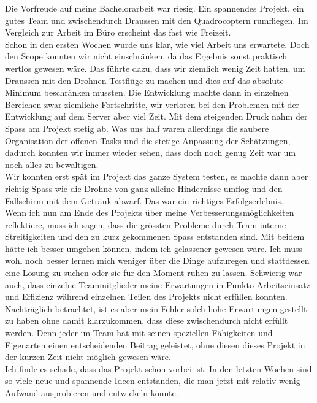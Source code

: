 Die Vorfreude auf meine Bachelorarbeit war riesig. Ein spannendes Projekt, ein gutes Team und zwischendurch Draussen mit den Quadrocoptern rumfliegen. Im Vergleich zur Arbeit im Büro erscheint das fast wie Freizeit.\\

Schon in den ersten Wochen wurde uns klar, wie viel Arbeit uns erwartete. Doch den Scope konnten wir nicht einschränken, da das Ergebnis sonst praktisch wertlos gewesen wäre. Das führte dazu, dass wir ziemlich wenig Zeit hatten, um Draussen mit den Drohnen Testflüge zu machen und dies auf das absolute Minimum beschränken mussten. Die Entwicklung machte dann in einzelnen Bereichen zwar ziemliche Fortschritte, wir verloren bei den Problemen mit der Entwicklung auf dem Server aber viel Zeit. Mit dem steigenden Druck nahm der Spass am Projekt stetig ab. Was uns half waren allerdings die saubere Organisation der offenen Tasks und die stetige Anpassung der Schätzungen, dadurch konnten wir immer wieder sehen, dass doch noch genug Zeit war um noch alles zu bewältigen.\\

Wir konnten erst spät im Projekt das ganze System testen, es machte dann aber richtig Spass wie die Drohne von ganz alleine Hindernisse umflog und den Fallschirm mit dem Getränk abwarf. Das war ein richtiges Erfolgserlebnis.\\

Wenn ich nun am Ende des Projekts über meine Verbesserungsmöglichkeiten reflektiere, muss ich sagen, dass die grössten Probleme durch Team-interne Streitigkeiten und den zu kurz gekommenen Spass entstanden sind. Mit beidem hätte ich besser umgehen können, indem ich gelassener gewesen wäre. Ich muss wohl noch besser lernen mich weniger über die Dinge aufzuregen und stattdessen eine Lösung zu suchen oder sie für den Moment ruhen zu lassen. Schwierig war auch, dass einzelne Teammitglieder meine Erwartungen in Punkto Arbeitseinsatz und Effizienz während einzelnen Teilen des Projekts nicht erfüllen konnten. Nachträglich betrachtet, ist es aber mein Fehler solch hohe Erwartungen gestellt zu haben ohne damit klarzukommen, dass diese zwischendurch nicht erfüllt werden. Denn jeder im Team hat mit seinen speziellen Fähigkeiten und Eigenarten einen entscheidenden Beitrag geleistet, ohne diesen dieses Projekt in der kurzen Zeit nicht möglich gewesen wäre. \\

Ich finde es schade, dass das Projekt schon vorbei ist. In den letzten Wochen sind so viele neue und spannende Ideen entstanden, die man jetzt mit relativ wenig Aufwand ausprobieren und entwickeln könnte.